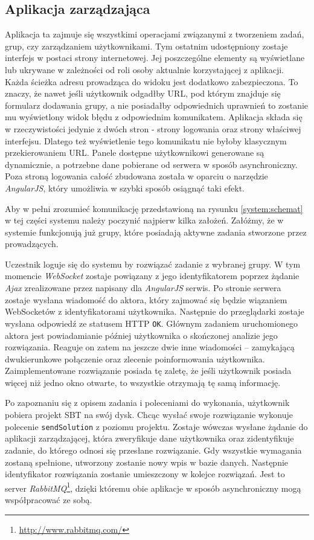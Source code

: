 \documentclass[wimgr]{xmgr}
\begin{document}
\subsection{Aplikacja zarządzająca}

Aplikacja ta zajmuje się wszystkimi operacjami związanymi z tworzeniem zadań, grup, czy zarządzaniem użytkownikami. Tym ostatnim udostępniony zostaje interfejs w postaci strony internetowej. Jej poszczególne elementy są wyświetlane lub ukrywane w zależności od roli osoby aktualnie korzystającej z aplikacji. Każda ścieżka adresu prowadząca do widoku jest dodatkowo zabezpieczona. To znaczy, że nawet jeśli użytkownik odgadłby URL, pod którym znajduje się formularz dodawania grupy, a nie posiadałby odpowiednich uprawnień to zostanie mu wyświetlony widok błędu z odpowiednim komunikatem. 
Aplikacja składa się w rzeczywistości jedynie z dwóch stron - strony logowania oraz strony właściwej interfejsu. Dlatego też wyświetlenie tego komunikatu nie byłoby klasycznym przekierowaniem URL.
Panele dostępne użytkownikowi generowane są dynamicznie, a potrzebne dane pobierane od serwera w sposób asynchroniczny. Poza stroną logowania całość zbudowana została w oparciu o narzędzie \emph{AngularJS}, który umożliwia w szybki sposób osiągnąć taki efekt.

Aby w pełni zrozumieć komunikację przedstawioną na rysunku \ref{system:schemat} w tej części systemu należy poczynić najpierw kilka założeń. Załóżmy, że w systemie funkcjonują już grupy, które posiadają aktywne zadania stworzone przez prowadzących. 

Uczestnik loguje się do systemu by rozwiązać zadanie z wybranej grupy. W tym momencie \emph{WebSocket} zostaje powiązany z jego identyfikatorem poprzez żądanie \emph{Ajax} zrealizowane przez napisany dla \emph{AngularJS} serwis. Po stronie serwera zostaje wysłana wiadomość do aktora, który zajmować się będzie wiązaniem WebSocketów z identyfikatorami użytkownika. Następnie do przeglądarki zostaje wysłana odpowiedź ze statusem HTTP \texttt{OK}. Głównym zadaniem uruchomionego aktora jest powiadamianie później użytkownika o skończonej analizie jego rozwiązania. Reaguje on zatem na jeszcze dwie inne wiadomości -- zamykającą dwukierunkowe połączenie oraz zlecenie poinformowania użytkownika. Zaimplementowane rozwiązanie posiada tę zaletę, że jeśli użytkownik posiada więcej niż jedno okno otwarte, to wszystkie otrzymają tę samą informację. 

Po zapoznaniu się z opisem zadania i poleceniami do wykonania, użytkownik pobiera projekt SBT na swój dysk. Chcąc wysłać swoje rozwiązanie wykonuje polecenie \texttt{sendSolution} z poziomu projektu. Zostaje wówczas wysłane żądanie do aplikacji zarządzającej, która zweryfikuje dane użytkownika oraz zidentyfikuje zadanie, do którego odnosi się przesłane rozwiązanie. Gdy wszystkie wymagania zostaną spełnione, utworzony zostanie nowy wpis w bazie danych. Następnie identyfikator rozwiązania zostanie umieszczony w kolejce rozwiązań. Jest to server \emph{RabbitMQ}\footnote{\url{http://www.rabbitmq.com/}}, dzięki któremu obie aplikacje w sposób asynchroniczny mogą współpracować ze sobą.
  
\end{document}
